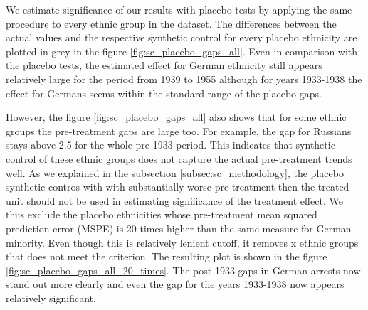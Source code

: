 We estimate significance of our results with placebo tests by applying the same procedure to every ethnic group in the dataset. The differences between the actual values and the respective synthetic control for every placebo ethnicity are plotted in grey in the figure \ref{fig:sc_placebo_gaps_all}. Even in comparison with the placebo tests, 
the estimated effect for German ethnicity  still appears relatively large for the period from 1939 to 1955 although for years 1933-1938 the effect for Germans seems within the standard range of the placebo gaps.

However, the figure \ref{fig:sc_placebo_gaps_all} also shows that for some ethnic groups the pre-treatment gaps are large too.
 For example, the gap for Russians stays above 2.5 for the whole pre-1933 period. 
 This indicates that synthetic control of these ethnic groups does not capture the actual pre-treatment trends well. 
 As we explained in the subsection \ref{subsec:sc_methodology}, the placebo synthetic contros  with with substantially  worse pre-treatment then the treated unit should not be 
used in estimating significance of the treatment effect. 
We thus  exclude the placebo ethnicities whose pre-treatment mean squared prediction error (MSPE) is 20 times higher than the same measure for German minority. Even though this is relatively lenient cutoff, it removes x ethnic groups that does not meet the criterion. 
The resulting plot is shown in the figure \ref{fig:sc_placebo_gaps_all_20_times}. The post-1933 gaps in German arrests now stand out more clearly and even the gap for the years 1933-1938 now appears relatively significant.  







